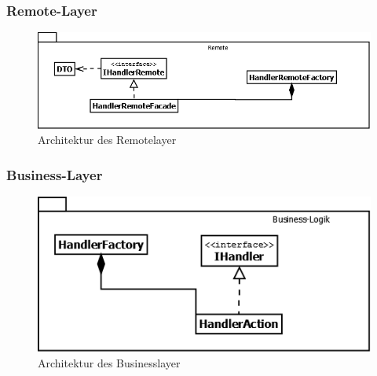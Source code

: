 \subsubsection{Remote-Layer}
\begin{figure}[H]
	\includegraphics[width=1.0\linewidth]{Images/RemoteLayer-Architektur}
	\caption{Architektur des Remotelayer}
	\label{fig:remotelayer-architektur}
\end{figure}

\subsubsection{Business-Layer}
\begin{figure}[H]
	\includegraphics[width=1.0\linewidth]{Images/BusinessLayer-Architektur}
	\caption{Architektur des Businesslayer}
	\label{fig:businesslayer-architektur}
\end{figure}

